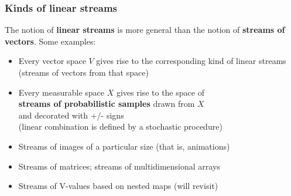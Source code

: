 \documentclass{beamer}
\newcommand{\msmagenta}[1]{{\color{mymagenta} #1}}
\begin{document}
\begin{frame}

\frametitle{Kinds of linear streams}

\msmagenta{The notion of {\bf linear streams} is more general than the notion
of {\bf streams of vectors}.} Some examples:\\[1ex]


\begin{itemize}


\item Every vector space $V$ gives rise to the corresponding kind of linear streams
(streams of vectors from that space)\\[2ex]

\item \msmagenta{Every measurable space $X$ gives rise to the space of\\ {\bf streams of
probabilistic samples} drawn from $X$\\ and decorated with +/- signs\\
(linear combination is defined by a stochastic procedure)}\\[2ex]

\item Streams of images of a particular size (that is, animations)\\[2ex]

\item Streams of matrices; streams of multidimensional arrays\\[2ex]

\item Streams of V-values based on nested maps (will revisit)\\[2ex]



\end{itemize}

\end{frame}
\end{document}
